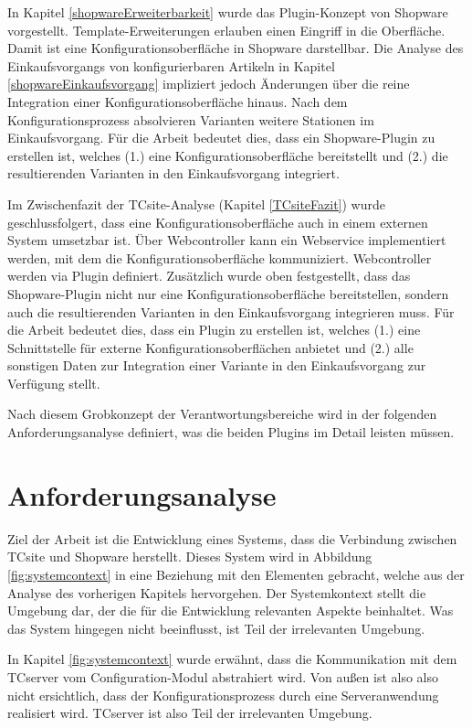 \documentclass[11pt, a4paper, titlepage, listof=totoc, bibliography=totoc, index=totoc, twoside, openright, headings=normal, draft]{scrreprt}
\begin{document}
In Kapitel \ref{shopwareErweiterbarkeit} wurde das Plugin-Konzept von Shopware vorgestellt. Template-Erweiterungen erlauben einen Eingriff in die Oberfläche. Damit ist eine Konfigurationsoberfläche in Shopware darstellbar. Die Analyse des Einkaufsvorgangs von konfigurierbaren Artikeln in Kapitel \ref{shopwareEinkaufsvorgang} impliziert jedoch Änderungen über die reine Integration einer Konfigurationsoberfläche hinaus. Nach dem Konfigurationsprozess absolvieren Varianten weitere Stationen im Einkaufsvorgang. Für die Arbeit bedeutet dies, dass ein Shopware-Plugin zu erstellen ist, welches (1.) eine Konfigurationsoberfläche bereitstellt und (2.) die resultierenden Varianten in den Einkaufsvorgang integriert.

Im Zwischenfazit der TCsite-Analyse (Kapitel \ref{TCsiteFazit}) wurde
geschlussfolgert, dass eine Konfigurationsoberfläche auch in einem externen System umsetzbar ist. Über Webcontroller kann ein Webservice implementiert werden, mit dem die Konfigurationsoberfläche kommuniziert. Webcontroller werden via Plugin definiert. Zusätzlich wurde oben festgestellt, dass das Shopware-Plugin nicht nur eine Konfigurationsoberfläche bereitstellen, sondern auch die resultierenden Varianten in den Einkaufsvorgang integrieren muss. Für die Arbeit bedeutet dies, dass ein Plugin zu erstellen ist, welches (1.) eine Schnittstelle für externe Konfigurationsoberflächen anbietet und (2.) alle sonstigen Daten zur Integration einer Variante in den Einkaufsvorgang zur Verfügung stellt. 

Nach diesem Grobkonzept der Verantwortungsbereiche wird in der folgenden Anforderungsanalyse definiert, was die beiden Plugins im Detail leisten müssen.

\section{Anforderungsanalyse}
Ziel der Arbeit ist die Entwicklung eines Systems, dass die Verbindung zwischen TCsite und Shopware herstellt. Dieses System wird in Abbildung \ref{fig:systemcontext} in eine Beziehung mit den Elementen gebracht, welche aus der Analyse des vorherigen Kapitels hervorgehen. Der Systemkontext stellt die Umgebung dar, der die für die Entwicklung relevanten Aspekte beinhaltet. Was das System hingegen nicht beeinflusst, ist Teil der irrelevanten Umgebung.

In Kapitel \ref{fig:systemcontext} wurde erwähnt, dass die Kommunikation mit dem TCserver vom Configuration-Modul abstrahiert wird. Von außen ist also also nicht ersichtlich, dass der Konfigurationsprozess durch eine Serveranwendung realisiert wird. TCserver ist also Teil der irrelevanten Umgebung.
\end{document}
